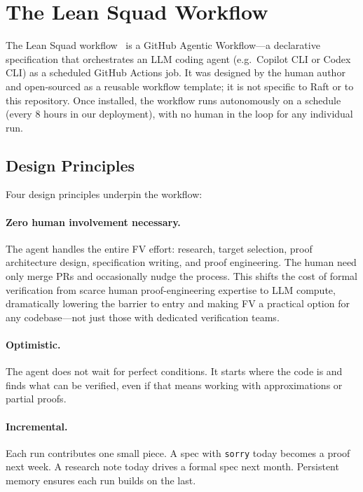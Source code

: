 \documentclass[sigconf,10pt]{acmart}
\begin{document}
\section{The Lean Squad Workflow}
\label{sec:workflow}

The Lean Squad workflow~\cite{leansquad} is a GitHub Agentic
Workflow---a declarative specification that orchestrates an LLM coding
agent (e.g.\ Copilot CLI or Codex CLI) as a scheduled GitHub Actions job.  It was designed
by the human author and open-sourced as a reusable workflow template; it
is not specific to Raft or to this repository.  Once installed, the
workflow runs autonomously on a schedule (every 8 hours in our
deployment), with no human in the loop for any individual run.

\subsection{Design Principles}

Four design principles underpin the workflow:

\paragraph{Zero human involvement necessary.}
The agent handles the entire FV effort: research, target selection,
proof architecture design, specification writing, and proof engineering.
The human need only merge PRs and occasionally nudge the process.
This shifts the cost of formal verification from scarce human proof-engineering
expertise to LLM compute, dramatically lowering the barrier to entry
and making FV a practical option for any codebase---not just those
with dedicated verification teams.

\paragraph{Optimistic.} The agent does not wait for perfect conditions.
It starts where the code is and finds what can be verified, even if
that means working with approximations or partial proofs.

\paragraph{Incremental.} Each run contributes one small piece.  A spec
with \texttt{sorry} today becomes a proof next week.  A research note
today drives a formal spec next month.  Persistent memory ensures each
run builds on the last.
\end{document}
